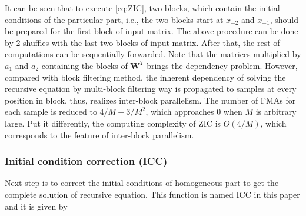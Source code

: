 
It can be seen that to execute \eqref{eq:ZIC}, two blocks, which contain the initial conditions of the particular part, 
i.e., the two blocks start at $x_{-2}$ and $x_{-1}$, should be prepared for the first block 
of input matrix. 
The above procedure can be done by 2 shuffles 
with the last two blocks of input matrix.
After that, the rest of computations can be sequentially forwarded.
Note that the matrices multiplied by $a_1$ and $a_2$ containing the blocks of $\bm{W}^T$
brings the dependency problem. 
However, compared with block filtering method,
the inherent dependency of solving the recursive equation by multi-block filtering way
is propagated to samples at every position in block, thus, realizes inter-block parallelism. 
The number of FMAs for each sample is reduced to $4/M{-}3/M^2$,
which approaches 0 when $M$ is arbitrary large.
Put it differently,
the computing complexity of ZIC is $O(4/M)$, which corresponds to the feature of inter-block parallelism.

\subsubsection{Initial condition correction (ICC)}

Next step is to correct the initial conditions of homogeneous part to get the complete solution of recursive equation.
This function is named ICC in this paper and it is given by

